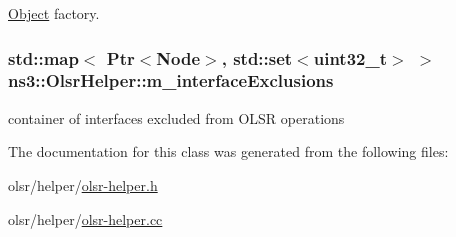 \hyperlink{classns3_1_1Object}{Object} factory. 

\subsubsection[{\texorpdfstring{m\+\_\+interface\+Exclusions}{m_interfaceExclusions}}]{\setlength{\rightskip}{0pt plus 5cm}std\+::map$<$ {\bf Ptr}$<${\bf Node}$>$, std\+::set$<$uint32\+\_\+t$>$ $>$ ns3\+::\+Olsr\+Helper\+::m\+\_\+interface\+Exclusions\hspace{0.3cm}{\ttfamily [private]}}\hypertarget{classns3_1_1OlsrHelper_af926eab0592bd5210491ffd2c769aa7d}{}\label{classns3_1_1OlsrHelper_af926eab0592bd5210491ffd2c769aa7d}


container of interfaces excluded from O\+L\+SR operations 



The documentation for this class was generated from the following files\+:\begin{DoxyCompactItemize}
\item 
olsr/helper/\hyperlink{olsr-helper_8h}{olsr-\/helper.\+h}\item 
olsr/helper/\hyperlink{olsr-helper_8cc}{olsr-\/helper.\+cc}\end{DoxyCompactItemize}
